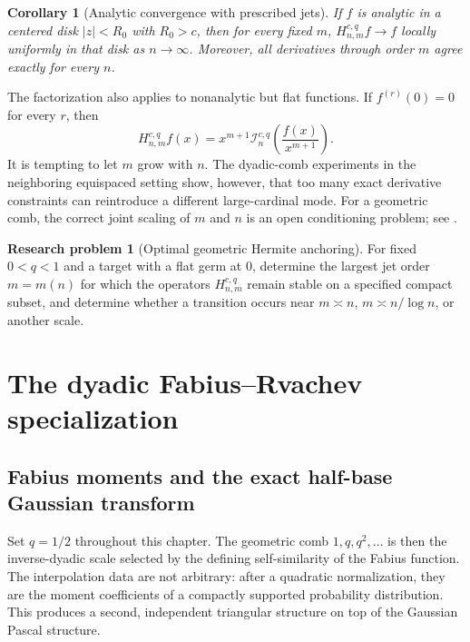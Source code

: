 \documentclass[11pt,oneside]{book}
\numberwithin{equation}{chapter}
\newtheorem{corollary}[theorem]{Corollary}
\theoremstyle{definition}
\newtheorem{problem}[theorem]{Research problem}
\theoremstyle{remark}
\newcommand{\Interp}{\mathcal I}
\begin{document}
\begin{corollary}[Analytic convergence with prescribed jets]
\label{cor:anchored-analytic}
If $f$ is analytic in a centered disk $|z|<R_0$ with $R_0>c$, then for every
fixed $m$, $H_{n,m}^{c,q}f\to f$ locally uniformly in that disk as
$n\to\infty$.
Moreover, all derivatives through order $m$ agree exactly for every $n$.
\end{corollary}

The factorization also applies to nonanalytic but flat functions.  If
$f^{(r)}(0)=0$ for every $r$, then
\begin{equation}
 H_{n,m}^{c,q}f(x)=x^{m+1}\Interp_n^{c,q}
                  \left(\frac{f(x)}{x^{m+1}}\right).
 \label{eq:flat-anchored-hermite}
\end{equation}
It is tempting to let $m$ grow with $n$.  The dyadic-comb experiments in the
neighboring equispaced setting show, however, that too many exact derivative
constraints can reintroduce a different large-cardinal mode.  For a
geometric comb, the correct joint scaling of $m$ and $n$ is an open
conditioning problem; see .

\begin{problem}[Optimal geometric Hermite anchoring]
\label{prob:optimal-geometric-hermite}
For fixed $0<q<1$ and a target with a flat germ at $0$, determine the largest
jet order $m=m(n)$ for which the operators $H_{n,m}^{c,q}$ remain stable on
a specified compact subset, and determine whether a transition occurs near
$m\asymp n$, $m\asymp n/\log n$, or another scale.
\end{problem}

\part{The dyadic Fabius--Rvachev specialization}

\chapter{Fabius moments and the exact half-base Gaussian transform}
\label{chap:fabius-transform}

Set $q=1/2$ throughout this chapter.  The geometric comb
$1,q,q^2,\ldots$ is then the inverse-dyadic scale selected by the defining
self-similarity of the Fabius function.  The interpolation data are not
arbitrary: after a quadratic normalization, they are the moment coefficients
of a compactly supported probability distribution.  This produces a second,
independent triangular structure on top of the Gaussian Pascal structure.
\end{document}
